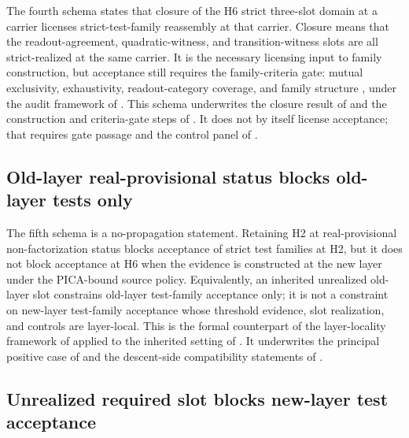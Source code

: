 \documentclass[11pt]{article}
\newcommand{\OldLayer}{H2}
\newcommand{\NewLayer}{H6}
\theoremstyle{definition}
\begin{document}
The fourth schema states that closure of the \NewLayer{} strict three-slot
domain at a carrier licenses strict-test-family reassembly at that carrier.
Closure means that the readout-agreement, quadratic-witness, and
transition-witness slots are all strict-realized at the same carrier.  It is
the necessary licensing input to family construction, but acceptance still
requires the family-criteria gate: mutual exclusivity, exhaustivity,
readout-category coverage, and family structure
\cite{Tsiokos2026CarrierToEvent}, under the audit framework of
\cite{Tsiokos2026FoundationsII}.  This schema underwrites the closure result of
 and the construction and
criteria-gate steps of
.  It
does not by itself license acceptance; that requires gate passage and the
control panel of .

\subsection{Old-layer real-provisional status blocks old-layer tests only}\label{subsec:schema-old-blocks-old-only}

The fifth schema is a no-propagation statement.  Retaining \OldLayer{} at
real-provisional non-factorization status blocks acceptance of strict test
families at \OldLayer{}, but it does not block acceptance at \NewLayer{} when
the evidence is constructed at the new layer under the PICA-bound source policy.
Equivalently, an inherited unrealized old-layer slot constrains old-layer
test-family acceptance only; it is not a constraint on new-layer test-family
acceptance whose threshold evidence, slot realization, and controls are
layer-local.  This is the formal counterpart of the layer-locality framework of
\cite{Tsiokos2026FoundationsII} applied to the inherited setting of
\cite{Tsiokos2026CarrierToEvent}.  It underwrites the principal positive case
of  and the descent-side compatibility statements of
.

\subsection{Unrealized required slot blocks new-layer test acceptance}\label{subsec:schema-unrealized-blocks-test}
\end{document}
